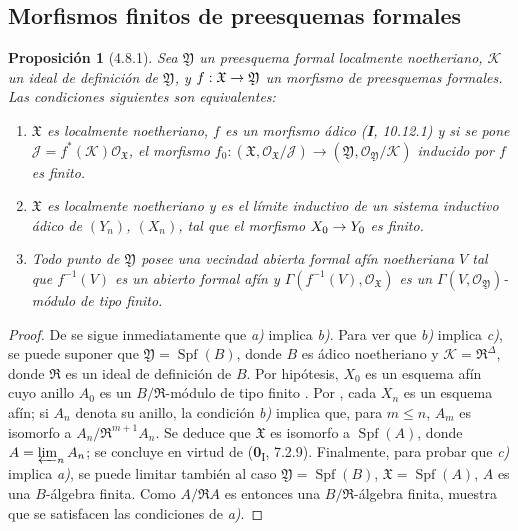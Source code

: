 \documentclass[10pt,oneside,openany]{book}
\theoremstyle{egaenv}\newtheorem*{env}{---}
\theoremstyle{egastatement}
\newtheorem*{proposition}{Proposición}
\theoremstyle{egadescription}
\newcommand{\oldpage}[2][]{\marginnote{\normalfont\scriptsize\textbf{#1}\,|\,#2}\ignorespaces}
\renewcommand{\leq}{\leqslant}
\renewcommand{\to}{\mathchoice{\longrightarrow}{\rightarrow}{\rightarrow}{\rightarrow}}
\begin{document}
\subsection{Morfismos finitos de preesquemas formales}

\begin{proposition}[4.8.1]
\label{III.4.8.1}
\label{III.4.8.1-fr}
Sea $\mathfrak Y$ un preesquema formal localmente noetheriano,
$\mathcal K$ un ideal de definición de $\mathfrak Y$, y
$f:\mathfrak X\to\mathfrak Y$ un morfismo de preesquemas formales.
Las condiciones siguientes son equivalentes:
\begin{enumerate}
  \item[\rm{a)}] $\mathfrak X$ es localmente noetheriano, $f$ es un morfismo ádico \textup{(\textbf{I}, 10.12.1)} y si se pone $\mathcal J=f^*(\mathcal K)\mathcal O_{\mathfrak X}$, el morfismo
    $f_0:(\mathfrak X,\mathcal O_{\mathfrak X}/\mathcal J)
  \longrightarrow
  (\mathfrak Y,\mathcal O_{\mathfrak Y}/\mathcal K)$
    inducido por $f$ es finito.
  \item[\rm{b)}] $\mathfrak X$ es localmente noetheriano y es el
    límite inductivo de un sistema inductivo ádico de $(Y_n)$, $(X_n)$,
    tal que el morfismo $X_0\to Y_0$ es finito.
  \item[\rm{c)}] Todo punto de $\mathfrak Y$ posee una vecindad abierta
    formal afín noetheriana $V$ tal que $f^{-1}(V)$ es
    un abierto formal afín y
    $\Gamma(f^{-1}(V),\mathcal O_{\mathfrak X})$ es un
    $\Gamma(V,\mathcal O_{\mathfrak Y})$-módulo de tipo finito.
\end{enumerate}
\end{proposition}

\begin{proof}
De  se sigue inmediatamente que \emph{a)} implica
\emph{b)}. Para ver que \emph{b)} implica \emph{c)}, se puede suponer
que
$\mathfrak Y=\operatorname{Spf}(B)$,
donde $B$ es ádico noetheriano y
$\mathcal K=\mathfrak R^\Delta$, donde $\mathfrak R$ es un ideal
de definición de $B$. Por hipótesis, $X_0$ es un esquema afín
cuyo anillo $A_0$ es un $B/\mathfrak R$-módulo de tipo finito
. Por , cada $X_n$ es un esquema
afín; si $A_n$ denota su anillo, la condición \emph{b)} implica que,
para $m\leq n$, $A_m$ es isomorfo a
$A_n/\mathfrak R^{m+1}A_n$. Se deduce que $\mathfrak X$ es isomorfo a
$\operatorname{Spf}(A)$, donde $A=\varprojlim_n A_n$; se concluye en virtud de
(\textbf{0}\textsubscript{I}, 7.2.9). Finalmente, para probar que \emph{c)}
\oldpage[III]{147}
implica \emph{a)}, se puede limitar también al caso
$\mathfrak Y=\operatorname{Spf}(B)$, $\mathfrak X=\operatorname{Spf}(A)$,
$A$ es una $B$-álgebra finita. Como
$A/\mathfrak RA$ es entonces una
$B/\mathfrak R$-álgebra finita,  muestra que se
satisfacen las condiciones de \emph{a)}.
\end{proof}
\end{document}

